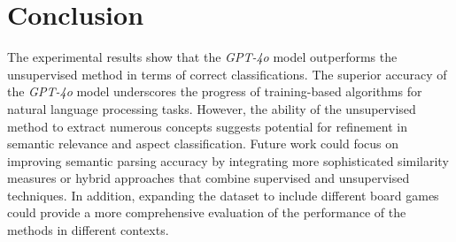 \documentclass[sn-mathphys-num]{sn-jnl}%
\theoremstyle{thmstyleone}%
\theoremstyle{thmstyletwo}%
\theoremstyle{thmstylethree}%
\begin{document}
\section{Conclusion}\label{results}
    The experimental results show that the \textit{GPT-4o} model outperforms the unsupervised method in terms of correct classifications. The superior accuracy of the \textit{GPT-4o} model underscores the progress of training-based algorithms for natural language processing tasks. However, the ability of the unsupervised method to extract numerous concepts suggests potential for refinement in semantic relevance and aspect classification. Future work could focus on improving semantic parsing accuracy by integrating more sophisticated similarity measures or hybrid approaches that combine supervised and unsupervised techniques. In addition, expanding the dataset to include different board games could provide a more comprehensive evaluation of the performance of the methods in different contexts.

\pagebreak







\end{document}
